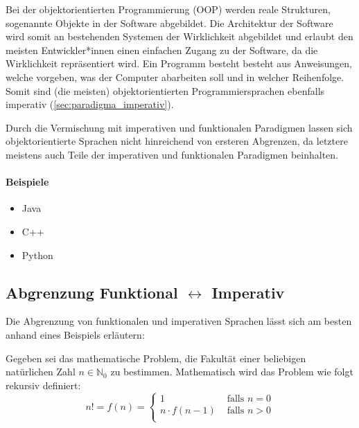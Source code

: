     Bei der objektorientierten Programmierung (OOP) werden reale Strukturen, sogenannte Objekte in der Software abgebildet. Die Architektur der Software wird somit an bestehenden Systemen der Wirklichkeit abgebildet und erlaubt den meisten Entwickler*innen einen einfachen Zugang zu der Software, da die Wirklichkeit repräsentiert wird. Ein Programm besteht besteht aus Anweisungen, welche vorgeben, was der Computer abarbeiten soll und in welcher Reihenfolge. Somit sind (die meisten) objektorientierten Programmiersprachen ebenfalls imperativ (\ref{sec:paradigma_imperativ}).
    
    Durch die Vermischung mit imperativen und funktionalen Paradigmen lassen sich objektorientierte Sprachen nicht hinreichend von ersteren Abgrenzen, da letztere meistens auch Teile der imperativen und funktionalen Paradigmen beinhalten.
    
    \paragraph{Beispiele}
        \begin{itemize}
            \item Java
            \item C++
            \item Python
        \end{itemize}

\subsection{Abgrenzung Funktional $ \leftrightarrow $ Imperativ}
    \label{sec:paradigma_abgrenzung_funktional_imperativ}
    
    Die Abgrenzung von funktionalen und imperativen Sprachen lässt sich am besten anhand eines Beispiels erläutern:
    
    Gegeben sei das mathematische Problem, die Fakultät einer beliebigen natürlichen Zahl $ n \in \mathbb{N} _ 0 $ zu bestimmen. Mathematisch wird das Problem wie folgt rekursiv definiert:
    \begin{equation*}
        n! = f(n) = \begin{cases*}
            1 & \text{ falls } n = 0 \\
            n \cdot f(n - 1) & \text{ falls } n > 0 \\
        \end{cases*}
    \end{equation*}
    
